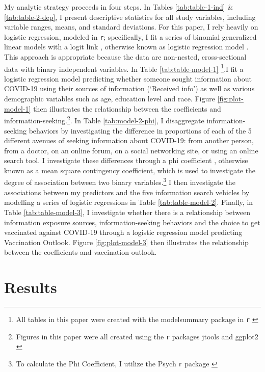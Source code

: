 My analytic strategy proceeds in four steps. In Tables \ref{tab:table-1-ind}
\& \ref{tab:table-2-dep}, I present descriptive statistics for all study
variables, including variable ranges, means, and standard deviations. For this
paper, I rely heavily on logistic regression, modeled in \texttt{r}; specifically, I
fit a series of binomial generalized linear models with a logit link \citep{venables2002a},
otherwise known as logistic regression model \citep{hothorn2006handbook}.
This approach is appropriate because the data
are non-nested, cross-sectional data with binary independent variables. In Table \ref{tab:table-model-1}
\footnote{All tables in this paper were created with the modelsummary package in \texttt{r} 
\citep{modelsummary}},I fit a logistic regression model predicting
whether someone sought information about COVID-19 using their sources of
information (`Received info') as well as various demographic variables such as
age, education level and race. Figure \ref{fig:plot-model-1} then illustrates
the relationship between the coefficients and information-seeking.\footnote{Figures 
in this paper were all created using the \texttt{r} packages jtools \citep{jtools}
and ggplot2 \citep{wickham_etal, wickham11}}.
In Table \ref{tab:model-2-phi}, I disaggregate information-seeking behaviors by
investigating the difference in proportions of each of the 5 different avenues
of seeking information about COVID-19: from another person, from a doctor, on an
online forum, on a social networking site, or using an online search tool. I
investigate these differences through a phi coefficient \citep{warrens08}, otherwise
known as a mean square contingency coefficient, which is used to investigate the
degree of association between two binary variables.\footnote{To calculate the Phi
  Coefficient, I utilize the Psych \texttt{r} package \citep{psych}} I then investigate the
associations between my predictors and the five information search vehicles by
modelling a series of logistic regressions in Table \ref{tab:table-model-2}.
Finally, in Table \ref{tab:table-model-3}, I investigate whether there is a
relationship between information exposure sources, information-seeking behaviors and
the choice to get vaccinated against COVID-19 through a logistic regression
model predicting Vaccination Outlook. Figure \ref{fig:plot-model-3} then
illustrates the relationship between the coefficients and vaccination outlook.

\hypertarget{results}{%
\section{Results}\label{results}}

